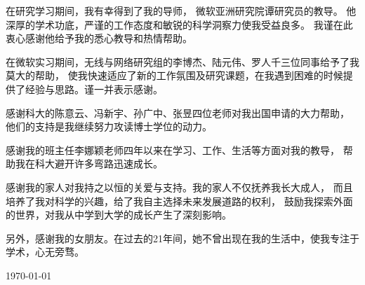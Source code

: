 \begin{acknowledgements}

在研究学习期间，我有幸得到了我的导师，
微软亚洲研究院谭研究员的教导。
他深厚的学术功底，严谨的工作态度和敏锐的科学洞察力使我受益良多。
我谨在此衷心感谢他给予我的悉心教导和热情帮助。

在微软实习期间，无线与网络研究组的李博杰、陆元伟、罗人千三位同事给予了我莫大的帮助，
使我快速适应了新的工作氛围及研究课题，在我遇到困难的时候提供了经验与思路。谨一并表示感谢。

感谢科大的陈意云、冯新宇、孙广中、张昱四位老师对我出国申请的大力帮助，
他们的支持是我继续努力攻读博士学位的动力。

感谢我的班主任李娜颖老师四年以来在学习、工作、生活等方面对我的教导，
帮助我在科大避开许多弯路迅速成长。

感谢我的家人对我持之以恒的关爱与支持。我的家人不仅抚养我长大成人，
而且培养了我对科学的兴趣，给了我自主选择未来发展道路的权利，
鼓励我探索外面的世界，对我从中学到大学的成长产生了深刻影响。

另外，感谢我的女朋友。在过去的21年间，她不曾出现在我的生活中，使我专注于学术，心无旁骛。

\bigskip
\rightline\today

\end{acknowledgements}
